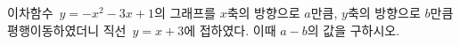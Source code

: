 이차함수~$y=-x^2-3x+1$의 그래프를 $x$축의 방향으로 $a$만큼, $y$축의 방향으로 $b$만큼 평행이동하였더니 직선~$y=x+3$에 접하였다. 이때 $a-b$의 값을 구하시오.
